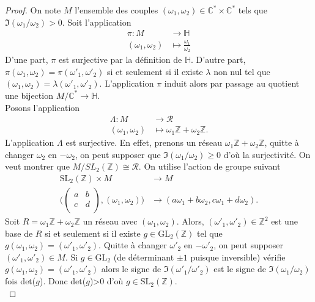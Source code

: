 \documentclass[a4paper]{article}
\begin{document}
\begin{proof}
On note $M$ l'ensemble des couples $(\omega_{1},\omega_{2}) \in \mathbb{C}^* \times \mathbb{C}^*$ tels que \\ $\Im(\omega_{1}/\omega_{2})>0$.
Soit l'application 
\begin{align*}
\pi : M &\rightarrow \mathbb{H} \\
(\omega_{1},\omega_{2}) &\mapsto \frac{\omega_{1}}{\omega_{2}}
\end{align*}
D'une part, $\pi$ est surjective par la définition de $\mathbb{H}$.
D'autre part, $\pi(\omega_{1},\omega_{2})=\pi(\omega'_{1},\omega'_{2})$ si et seulement si il existe $\lambda$ non nul tel que $(\omega_{1},\omega_{2})=\lambda(\omega'_{1},\omega'_{2})$.
L'application $\pi$ induit alors par passage au quotient une bijection $M/\mathbb{C}^* \rightarrow \mathbb{H}$.\\
Posons l'application 
\begin{align*}
\Lambda : M &\rightarrow \mathscr{R} \\
(\omega_{1},\omega_{2}) &\mapsto \omega_{1}\mathbb{Z}+\omega_{2}\mathbb{Z}.
\end{align*}
L'application $\Lambda$ est surjective. En effet, prenons un réseau $\omega_{1}\mathbb{Z} + \omega_{2}\mathbb{Z}$, quitte à changer $\omega_{2}$ en $-\omega_{2}$, on peut supposer que $\Im(\omega_{1}/\omega_{2})\geqslant 0$ d'où la surjectivité.
On veut montrer que $M/SL_{2}(\mathbb{Z}) \cong \mathscr{R}$. On utilise l'action de groupe suivant
\begin{align*}
\text{SL}_{2}(\mathbb{Z}) \times M &\rightarrow M \\
\Big(
  \left( {\begin{array}{cc}
   a & b \\
   c & d \\
  \end{array} } \right) ,
  (\omega_{1},\omega_{2}) \Big) &\rightarrow (a\omega_{1}+b\omega_{2}, c\omega_{1}+d\omega_{2}).
\end{align*}
Soit $R=\omega_{1}\mathbb{Z} + \omega_{2}\mathbb{Z}$ un réseau avec $(\omega_{1},\omega_{2})$. Alors, $(\omega'_{1},\omega'_{2}) \in \mathbb{Z}^2$ est une base de $R$ si et seulement si il existe $g \in \text{GL}_{2}(\mathbb{Z})$ tel que $g(\omega_{1},\omega_{2})=(\omega'_{1},\omega'_{2})$. Quitte à changer $\omega'_{2}$ en $-\omega'_{2}$, on peut supposer $(\omega'_{1},\omega'_{2}) \in M$. Si $g \in \text{GL}_{2}$ (de déterminant $\pm 1$ puisque inversible) vérifie $g(\omega_{1},\omega_{2})=(\omega'_{1},\omega'_{2})$ alors le signe de $\Im(\omega'_{1}/\omega'_{2})$ est le signe de $\Im(\omega_{1}/\omega_{2})$ fois det($g$). Donc det($g$)>0 d'où $g \in \text{SL}_{2}(\mathbb{Z})$. \\

\end{proof}
\end{document}
